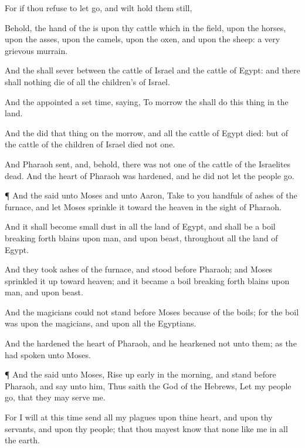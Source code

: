 {For if thou
refuse to let
{}
go, and wilt
hold them still,

Behold, the
hand of the
{}
is upon thy
cattle which
{} in the
field, upon the
horses, upon the
asses, upon the
camels, upon the
oxen, and upon the
sheep:
{} a
very
grievous
murrain.

And the
{} shall
sever between the
cattle of
Israel and the
cattle of
Egypt: and there shall
nothing
die of all
{} the
children’s of
Israel.

And the
{}
appointed a set
time,
saying, To
morrow the
{} shall
do this
thing in the
land.

And the
{}
did that
thing on the
morrow, and all the
cattle of
Egypt
died: but of the
cattle of the
children of
Israel
died not
one.

And
Pharaoh
sent, and, behold, there was not
one of the
cattle of the
Israelites
dead. And the
heart of
Pharaoh was
hardened, and he did not let the
people
go.


\par }{\PP {}¶ And the
{}
said unto
Moses and unto
Aaron,
Take to you
handfuls of
ashes of the
furnace, and let
Moses
sprinkle it toward the
heaven in the
sight of
Pharaoh.

And it shall become small
dust in all the
land of
Egypt, and shall be a
boil breaking
forth
{}
blains upon
man, and upon
beast, throughout all the
land of
Egypt.

And they
took
ashes of the
furnace, and
stood
before
Pharaoh; and
Moses
sprinkled it up toward
heaven; and it became a
boil breaking
forth
{}
blains upon
man, and upon
beast.

And the
magicians
could not
stand
before
Moses
because of the
boils; for the
boil was upon the
magicians, and upon all the
Egyptians.

And the
{}
hardened the
heart of
Pharaoh, and he
hearkened not unto them; as the
{} had
spoken unto
Moses.


\par }{\PP {}¶ And the
{}
said unto
Moses, Rise up
early in the
morning, and
stand
before
Pharaoh, and
say unto him, Thus
saith the
{}
God of the
Hebrews, Let my
people
go, that they may
serve me.

For I will at this
time
send all my
plagues upon thine
heart, and upon thy
servants, and upon thy
people; that thou mayest
know that
{} none like me in all the
earth.

}
